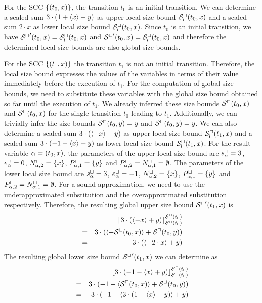 \begin{example}
  For the SCC $\lbrace (t_0,x) \rbrace$, the transition $t_0$ is an initial transition.
  We can determine a scaled sum $3 \cdot (1 + \langle x\rangle - y)$ as upper local size bound ${\mathcal{S}^\sqcap_l}(t_0,x)$ and a scaled sum $2 \cdot x$ as lower local size bound ${\mathcal{S}^\sqcup_l}(t_0,x)$.
  Since $t_0$ is an initial transition, we have ${\mathcal{S}^\sqcap}'(t_0,x) = {\mathcal{S}^\sqcap_l}(t_0,x)$ and ${\mathcal{S}^\sqcup}'(t_0,x) = {\mathcal{S}^\sqcup_l}(t_0,x)$ and therefore the determined local size bounds are also global size bounds.
\end{example}
  
\begin{example}
  For the SCC $\lbrace (t_1,x) \rbrace$ the transition $t_1$ is not an initial transition.
  Therefore, the local size bound expresses the values of the variables in terms of their value immediately before the execution of $t_1$.
  For the computation of global size bounds, we need to substitute these variables with the global size bound obtained so far until the execution of $t_1$.
  We already inferred these size bounds ${\mathcal{S}^\sqcap}(t_0,x)$ and ${\mathcal{S}^\sqcup}(t_0,x)$ for the single transition $t_0$ leading to $t_1$.
  Additionally, we can trivially infer the size bounds ${\mathcal{S}^\sqcap}(t_0,y) = y$ and ${\mathcal{S}^\sqcup}(t_0,y) = y$.
  We can also determine a scaled sum $3 \cdot (\langle-x\rangle + y)$ as upper local size bound ${\mathcal{S}^\sqcap_l}(t_1,x)$ and a scaled sum $3 \cdot (-1 - \langle x\rangle + y)$ as lower local size bound ${\mathcal{S}^\sqcup_l}(t_1,x)$.
  For the result variable $\alpha = (t_0,x)$, the parameters of the upper local size bound are $s^\sqcap_\alpha = 3$, $e^\sqcap_\alpha = 0$, $N^\sqcap_{\alpha,2} = \lbrace x \rbrace$, $P^\sqcap_{\alpha,1} = \lbrace y \rbrace$ and $P^\sqcap_{\alpha,2} = N^\sqcap_{\alpha,1} = \emptyset$.
  The parameters of the lower local size bound are $s^\sqcup_\alpha = 3$, $e^\sqcup_\alpha = -1$, $N^\sqcup_{\alpha,2} = \lbrace x \rbrace$, $P^\sqcup_{\alpha,1} = \lbrace y \rbrace$ and $P^\sqcup_{\alpha,2} = N^\sqcup_{\alpha,1} = \emptyset$.
  For a sound approximation, we need to use the underapproximated substitution and the overapproximated substitution respectively.
  Therefore, the resulting global upper size bound ${\mathcal{S}^\sqcap}'(t_1,x)$ is 
  \begin{align*}
    && \lceil 3 \cdot \left( \langle-x\rangle + y \right)  \rceil^{{\mathcal{S}^\sqcap}(t_0)}_{{\mathcal{S}^\sqcup}(t_0)} \\
    & = & 3 \cdot \left( \langle-{\mathcal{S}^\sqcup}(t_0, x)\rangle + {\mathcal{S}^\sqcap}(t_0, y) \right) \\
    & = & 3 \cdot \left( \langle-2 \cdot x\rangle + y \right)
  \end{align*}
  The resulting global lower size bound ${\mathcal{S}^\sqcup}'(t_1,x)$ we can determine as
  \begin{align*}
    && \lfloor 3 \cdot \left( -1 - \langle x\rangle + y \right)  \rfloor^{{\mathcal{S}^\sqcap}(t_0)}_{{\mathcal{S}^\sqcup}(t_0)} \\
    & = & 3 \cdot \left( -1 - \langle{\mathcal{S}^\sqcap}(t_0, x)\rangle + {\mathcal{S}^\sqcup}(t_0, y) \right) \\
    & = & 3 \cdot \left( -1 - \langle3 \cdot (1 + \langle x\rangle - y)\rangle + y \right)
  \end{align*}
\end{example}
